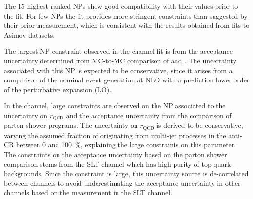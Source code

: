 The 15 highest ranked NPs show good compatibility with their values prior to the
fit. For few NPs the fit provides more stringent constraints than suggested by
their prior measurement, which is consistent with the results obtained from fits
to Asimov datasets.

The largest NP constraint observed in the \hadhad channel fit is from the \ZHF
acceptance uncertainty determined from MC-to-MC comparison of \SHERPA and
\MGNLOPY. The uncertainty associated with this NP is expected to be
conservative, since it arises from a comparison of the nominal event generation
at NLO with a prediction lower order of the perturbative expansion (LO).

In the \lephad channel, large constraints are observed on the NP associated to
the uncertainty on $r_{\text{QCD}}$ and the \ttbar acceptance uncertainty from
the comparison of parton shower programs. The uncertainty on $r_{\text{QCD}}$ is
derived to be conservative, varying the assumed fraction of \faketauhadvis
originating from multi-jet processes in the anti-\tauhadvis CR between 0 and
\SI{100}{\percent}, explaining the large constraints on this parameter. The
constraints on the \ttbar acceptance uncertainty based on the parton shower
comparison stems from the \lephad SLT channel which has high purity of top quark
backgrounds. Since the constraint is large, this uncertainty source is
de-correlated between channels to avoid underestimating the acceptance
uncertainty in other channels based on the measurement in the \lephad SLT
channel.

